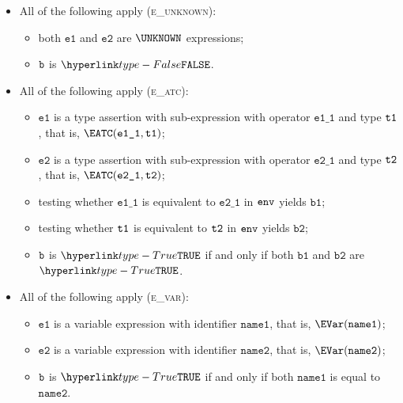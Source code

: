 \documentclass{book}
\newcommand\veone[0]{\texttt{e1}}
\newcommand\vetwo[0]{\texttt{e2}}
\newcommand\veoneone[0]{\texttt{e1\_1}}
\newcommand\vetwoone[0]{\texttt{e2\_1}}
\newcommand\vbone[0]{\texttt{b1}}
\newcommand\vbtwo[0]{\texttt{b2}}
\newcommand\nameone[0]{\texttt{name1}}
\newcommand\nametwo[0]{\texttt{name2}}
\begin{document}
\begin{itemize}
  \item All of the following apply (\textsc{e\_unknown}):
  \begin{itemize}
    \item both $\veone$ and $\vetwo$ are $\UNKNOWN$ expressions;
    \item $\texttt{b}$ is $\False$.
  \end{itemize}

  \item All of the following apply (\textsc{e\_atc}):
  \begin{itemize}
    \item $\veone$ is a type assertion with sub-expression with operator $\veoneone$ and type $\texttt{t1}$,
          that is, $\EATC(\veoneone, \vtone)$;
    \item $\vetwo$ is a type assertion with sub-expression with operator $\vetwoone$ and type $\texttt{t2}$,
          that is, $\EATC(\vetwoone, \vttwo)$;
    \item testing whether $\veoneone$ is equivalent to $\vetwoone$ in $\texttt{env}$ yields $\vbone$;
    \item testing whether $\texttt{t1}$ is equivalent to $\texttt{t2}$ in $\texttt{env}$ yields $\vbtwo$;
    \item $\texttt{b}$ is $\True$ if and only if both $\vbone$ and $\vbtwo$ are $\True$.
  \end{itemize}

  \item All of the following apply (\textsc{e\_var}):
  \begin{itemize}
    \item $\veone$ is a variable expression with identifier $\nameone$, that is, $\EVar(\nameone)$;
    \item $\vetwo$ is a variable expression with identifier $\nametwo$, that is, $\EVar(\nametwo)$;
    \item $\texttt{b}$ is $\True$ if and only if both $\nameone$ is equal to $\nametwo$.
  \end{itemize}
\end{itemize}
\end{document}
